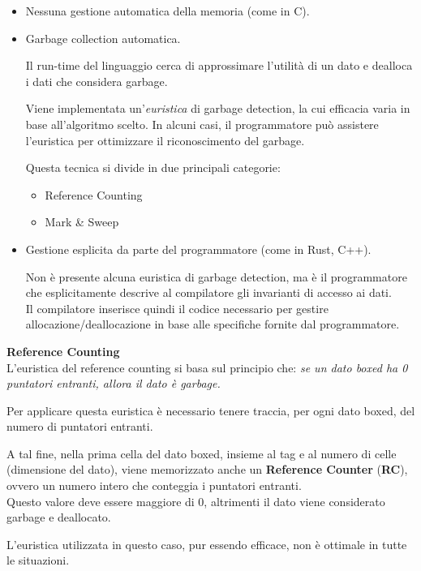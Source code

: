 \documentclass{article}
\begin{document}
\begin{itemize}
    \item Nessuna gestione automatica della memoria (come in C).
    \item Garbage collection automatica. 
    
    Il run-time del linguaggio cerca di approssimare l'utilità di un dato e dealloca i dati che considera garbage.
    
    Viene implementata un'\textit{euristica} di garbage detection, la cui efficacia varia in base all'algoritmo scelto. In alcuni casi, il programmatore può assistere l'euristica per ottimizzare il riconoscimento del garbage.

    Questa tecnica si divide in due principali categorie:
    \begin{itemize}
        \item Reference Counting
        \item Mark \& Sweep
    \end{itemize}
    \item Gestione esplicita da parte del programmatore (come in Rust, C++).
    
    Non è presente alcuna euristica di garbage detection, ma è il programmatore che esplicitamente descrive al compilatore gli invarianti di accesso ai dati.\\
    Il compilatore inserisce quindi il codice necessario per gestire allocazione/deallocazione in base alle specifiche fornite dal programmatore.\vspace{8pt}
\end{itemize}

\textbf{Reference Counting}\\
L'euristica del reference counting si basa sul principio che: \textit{se un dato boxed ha 0 puntatori entranti, allora il dato è garbage.}

Per applicare questa euristica è necessario tenere traccia, per ogni dato boxed, del numero di puntatori entranti.

A tal fine, nella prima cella del dato boxed, insieme al tag e al numero di celle (dimensione del dato), viene memorizzato anche un \textbf{Reference Counter} (\textbf{RC}), ovvero un numero intero che conteggia i puntatori entranti.\\
Questo valore deve essere maggiore di 0, altrimenti il dato viene considerato garbage e deallocato.

L'euristica utilizzata in questo caso, pur essendo efficace, non è ottimale in tutte le situazioni.
\end{document}
